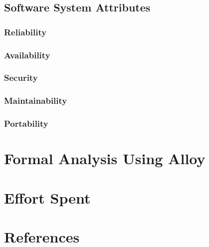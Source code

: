     \section{Software System Attributes}
        \subsection{Reliability}
        	
        \subsection{Availability}
        	
        \subsection{Security}
        	
        \subsection{Maintainability}
        	
        \subsection{Portability}
        	

\newpage
\chapter{Formal Analysis Using Alloy}
	
\chapter{Effort Spent}
    
\chapter{References}
	


